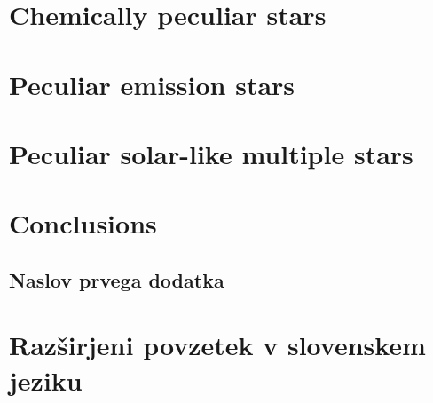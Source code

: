 \chapter{Chemically peculiar stars}
\label{chap:peculiars_chem}


\chapter{Peculiar emission stars}
\label{chap:peculiars_emis}


\chapter{Peculiar solar-like multiple stars}
\label{chap:twins}


\chapter{Conclusions}
\label{chap:conclusion}




\cleardoublepage{}
\renewcommand\bibname{Bibliography}





\cleardoublepage{}
\renewcommand\appendixname{Appendix}
\begin{appendices}

\chapter{Naslov prvega dodatka}
    

\end{appendices}


\cleardoublepage{}
{}
\chapter*{Razširjeni povzetek v slovenskem jeziku}

